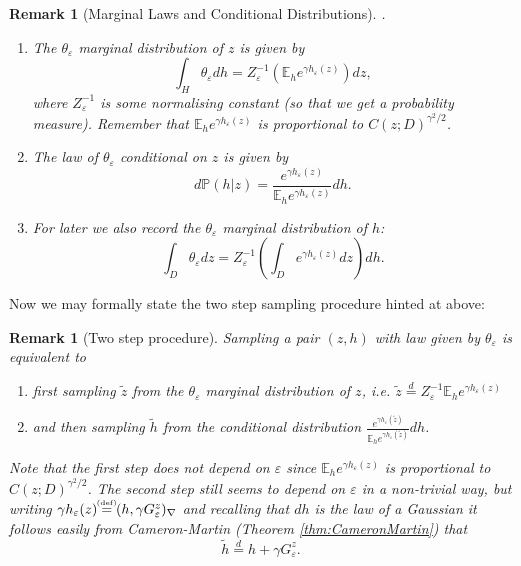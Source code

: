 \documentclass[11pt,reqno]{amsart}
\numberwithin{equation}{section}
\newtheorem{rem}[thm]{Remark}
\newcommand{\eqby}[1]{\mathrel{\stackrel{#1}{=}}}
\newcommand{\eqbydef}{\mathrel{\stackrel{\hspace*{-3mm}\text{\tiny(def)}\hspace*{-3mm}}{=}}}
\newcommand{\eps}{\varepsilon}
\begin{document}
\begin{rem}[Marginal Laws and Conditional Distributions]\label{rem:marginalLawsandCondDistr}.\\
	\begin{enumerate}
		\item The $\theta_\eps$ marginal distribution of $z$ is given by $$\int_H\theta_\eps dh = Z_\eps^{-1}\left(\mathbb E_h e^{\gamma h_\eps(z)}\right)dz,$$ where $Z_\eps^{-1}$ is some normalising constant (so that we get a probability measure). Remember that $\mathbb E_h e^{\gamma h_\eps(z)}$ is proportional to $C(z;D)^{\gamma^2/2}$.
		\item The law of $\theta_\eps$ conditional on $z$ is given by $$d\mathbb P(h|z)=\frac{e^{\gamma h_\eps(z)}}{\mathbb E_h e^{\gamma h_\eps(z)}}dh.$$
		\item For later we also record the $\theta_\eps$ marginal distribution of $h$: $$\int_D\theta_\eps dz = Z_\eps^{-1}\left(\int_D e^{\gamma h_\eps(z)}dz\right)dh.$$
	\end{enumerate}
\end{rem}

Now we may formally state the two step sampling procedure hinted at above:

\begin{rem}[Two step procedure]\label{rem:twoStepProcedure}
	Sampling a pair $(z,h)$ with law given by $\theta_\eps$ is equivalent to
	\begin{enumerate}
		\item first sampling $\tilde z$ from the $\theta_\eps$ marginal distribution of $z$, i.e. $\tilde z\eqby{d} Z_\eps^{-1}\mathbb E_h e^{\gamma h_\eps(z)}$
		\item and then sampling $\tilde h$ from the conditional distribution $\frac{e^{\gamma h_\eps(\tilde z)}}{\mathbb E_h e^{\gamma h_\eps(\tilde z)}}dh$.
	\end{enumerate}
	Note that the first step does not depend on $\eps$ since $\mathbb E_h e^{\gamma h_\eps(z)}$ is proportional to $C(z;D)^{\gamma^2/2}$. The second step still seems to depend on $\eps$ in a non-trivial way, but writing $\gamma h_\eps(z)\eqbydef (h,\gamma G_\eps^z)_\nabla$ and recalling that $dh$ is the law of a Gaussian it follows easily from Cameron-Martin (Theorem \ref{thm:CameronMartin}) that \begin{equation}\label{eq:lawoftildeHisHplusGreensFct}
			\tilde h\eqby{d}h+\gamma G_\eps^z.
		\end{equation}
\end{rem}
\end{document}
